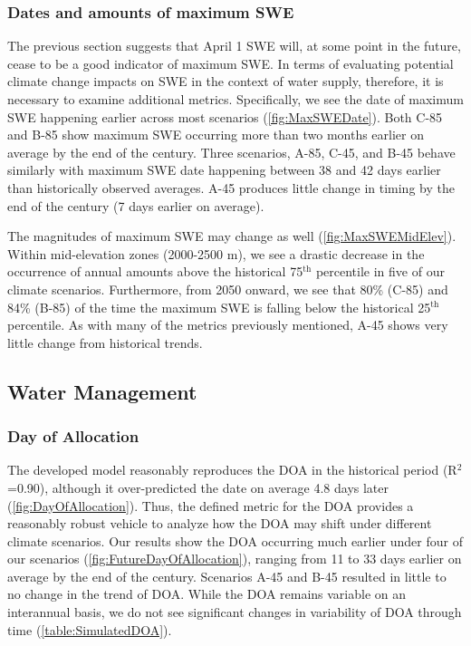 \documentclass[water,article,submit,moreauthors,pdftex,10pt,a4paper]{mdpi}
\theoremstyle{mdpi}
\newcounter{ex}
\newcounter{re}
\theoremstyle{mdpidefinition}
\begin{document}
\subsubsection{Dates and amounts of maximum SWE}

The previous section suggests that April 1 SWE will, at some point in the future, cease to be a good indicator of maximum SWE. In terms of evaluating potential climate change impacts on SWE in the context of water supply, therefore, it is necessary to examine additional metrics. Specifically, we see the date of maximum SWE happening earlier across most scenarios (\cref{fig:MaxSWEDate}). Both C-85 and B-85 show maximum SWE occurring more than two months earlier on average by the end of the century. Three scenarios, A-85, C-45, and B-45 behave similarly with maximum SWE date happening between 38 and 42 days earlier than historically observed averages. A-45 produces little change in timing by the end of the century (7 days earlier on average). 

The magnitudes of maximum SWE may change as well (\cref{fig:MaxSWEMidElev}). Within mid-elevation zones (2000-2500 m), we see a drastic decrease in the occurrence of annual amounts above the historical 75${}^\textrm{th}$ percentile in five of our climate scenarios. Furthermore, from 2050 onward, we see that 80\% (C-85) and 84\% (B-85) of the time the maximum SWE is falling below the historical 25${}^\textrm{th}$ percentile. As with many of the metrics previously mentioned, A-45 shows very little change from historical trends.

\subsection{Water Management}

\subsubsection{Day of Allocation}

The developed model reasonably reproduces the DOA in the historical period (R${}^2$=0.90), although it over-predicted the date on average 4.8 days later (\cref{fig:DayOfAllocation}). Thus, the defined metric for the DOA provides a reasonably robust vehicle to analyze how the DOA may shift under different climate scenarios.
Our results show the DOA occurring much earlier under four of our scenarios (\cref{fig:FutureDayOfAllocation}), ranging from 11 to 33 days earlier on average by the end of the century. Scenarios A-45 and B-45 resulted in little to no change in the trend of DOA. While the DOA remains variable on an interannual basis, we do not see significant changes in variability of DOA through time (\cref{table:SimulatedDOA}).
\end{document}
